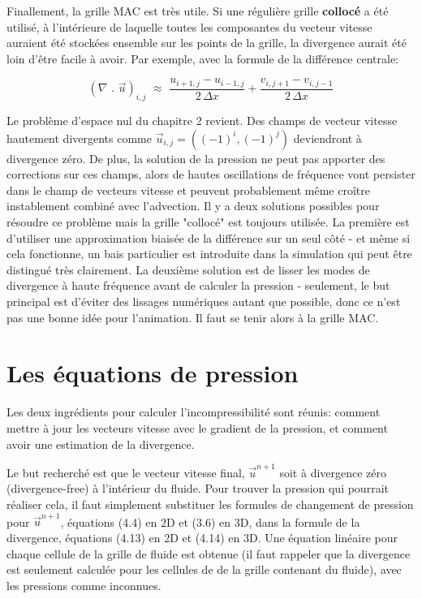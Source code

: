 \documentclass[11pt]{report}
\begin{document}
Finallement, la grille MAC est très utile. Si une régulière grille \textbf{collocé} a été utilisé, à l'intérieure de laquelle toutes les composantes du vecteur vitesse auraient été stockées ensemble sur les points de la grille, la divergence aurait été loin d'être facile à avoir. Par exemple, avec la formule de la différence centrale:

\begin{equation}
(\nabla \,\,.\,\, \overrightarrow{u})_{i,j} \,\, \approx \,\, \frac{u_{i+1, j} - u_{i-1, j}}{2 \, \Delta x} + \frac{v_{i,j+1} - v_{i,j-1}}{2 \, \Delta x}
\end{equation}
 
Le problème d'espace nul du chapitre 2 revient. Des champs de vecteur vitesse hautement divergents comme $\overrightarrow{u}_{i,j} = ((-1)^i,(-1)^j)$ deviendront à divergence zéro. De plus, la solution de la pression ne peut pas apporter des corrections sur ces champs, alors de hautes oscillations de fréquence vont persister dans le champ de vecteurs vitesse et peuvent probablement même croître instablement combiné avec l'advection. Il y a deux solutions possibles pour résoudre ce problème mais la grille "collocé" est toujours utilisée. La première est d'utiliser une approximation biaisée de la différence sur un seul côté -  et même si cela fonctionne, un bais particulier est introduite dans la simulation qui peut être distingué très clairement. La deuxième solution est de lisser les modes de divergence à haute fréquence avant de calculer la pression - seulement, le but principal est d'éviter des lissages numériques autant que possible, donc ce n'est pas une bonne idée pour l'animation. Il faut se tenir alors à la grille MAC.


\section{Les équations de pression}

Les deux ingrédients pour calculer l'incompressibilité sont réunis: comment mettre à jour les vecteurs vitesse avec le gradient de la pression, et comment avoir une estimation de la divergence.

Le but recherché est que le vecteur vitesse final, $\overrightarrow{u}^{n+1}$ soit à divergence zéro (divergence-free) à l'intérieur du fluide. Pour trouver la pression qui pourrait réaliser cela, il faut simplement substituer les formules de changement de pression pour $\overrightarrow{u}^{n+1}$, équations (4.4) en 2D et (3.6) en 3D, dans la formule de la divergence, équations (4.13) en 2D et (4.14) en 3D. Une équation linéaire pour chaque cellule de la grille de fluide est obtenue (il faut rappeler que la divergence est seulement calculée pour les cellules de de la grille contenant du fluide), avec les pressions comme inconnues.
\end{document}
